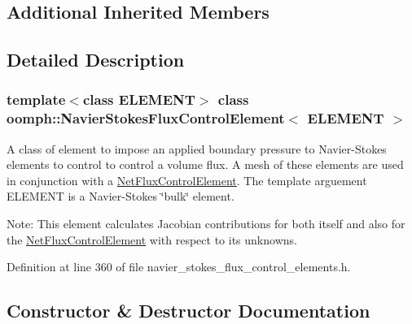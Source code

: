 \subsection*{Additional Inherited Members}


\subsection{Detailed Description}
\subsubsection*{template$<$class E\+L\+E\+M\+E\+NT$>$\newline
class oomph\+::\+Navier\+Stokes\+Flux\+Control\+Element$<$ E\+L\+E\+M\+E\+N\+T $>$}

A class of element to impose an applied boundary pressure to Navier-\/\+Stokes elements to control to control a volume flux. A mesh of these elements are used in conjunction with a \hyperlink{classoomph_1_1NetFluxControlElement}{Net\+Flux\+Control\+Element}. The template arguement E\+L\+E\+M\+E\+NT is a Navier-\/\+Stokes \char`\"{}bulk\char`\"{} element.

Note\+: This element calculates Jacobian contributions for both itself and also for the \hyperlink{classoomph_1_1NetFluxControlElement}{Net\+Flux\+Control\+Element} with respect to its unknowns. 

Definition at line 360 of file navier\+\_\+stokes\+\_\+flux\+\_\+control\+\_\+elements.\+h.



\subsection{Constructor \& Destructor Documentation}
\mbox{\label{classoomph_1_1NavierStokesFluxControlElement_a85e1b1b55072f13ca39219ca1fb9a4d6}} 
